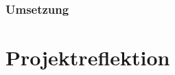 \documentclass[a4paper]{article}
\begin{document}
\newpage
\subsubsection{Umsetzung}



\newpage

\section{Projektreflektion}

\newpage

\listoffigures

\newpage 

\listoftables
\end{document}
